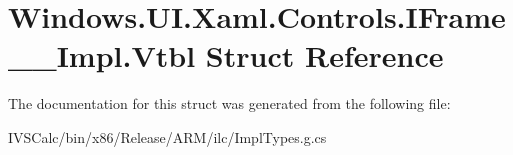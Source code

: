 \hypertarget{struct_windows_1_1_u_i_1_1_xaml_1_1_controls_1_1_i_frame_____impl_1_1_vtbl}{}\section{Windows.\+U\+I.\+Xaml.\+Controls.\+I\+Frame\+\_\+\+\_\+\+Impl.\+Vtbl Struct Reference}
\label{struct_windows_1_1_u_i_1_1_xaml_1_1_controls_1_1_i_frame_____impl_1_1_vtbl}


The documentation for this struct was generated from the following file\+:\begin{DoxyCompactItemize}
\item 
I\+V\+S\+Calc/bin/x86/\+Release/\+A\+R\+M/ilc/Impl\+Types.\+g.\+cs\end{DoxyCompactItemize}
